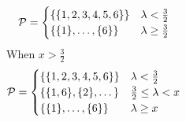 \documentclass[notheorems]{beamer}
\begin{document}
\begin{frame}
\begin{columns}
\begin{equation*}
	 \P = 
	 \begin{cases}
	 	\{\{1,2,3,4,5,6\}\} & \lambda < \frac{3}{2} \\
	 	\{\{1\},\dots,\{6\}\} &  \lambda \geq \frac{3}{2}
	 \end{cases}
	\end{equation*}	
	When	$ x > \frac{3}{2}$
	\begin{equation*}
		\P = 
		\begin{cases}
			\{\{1,2,3,4,5,6\}\} & \lambda <  \frac{3}{2}\\
			\{\{1,6\}, \{2\},\dots\} &  \frac{3}{2} \leq \lambda  < x\\
				\{\{1\},\dots,\{6\}\} &  \lambda \geq x
		\end{cases}
	\end{equation*}				
	\end{columns}
\end{frame}
\end{document}
